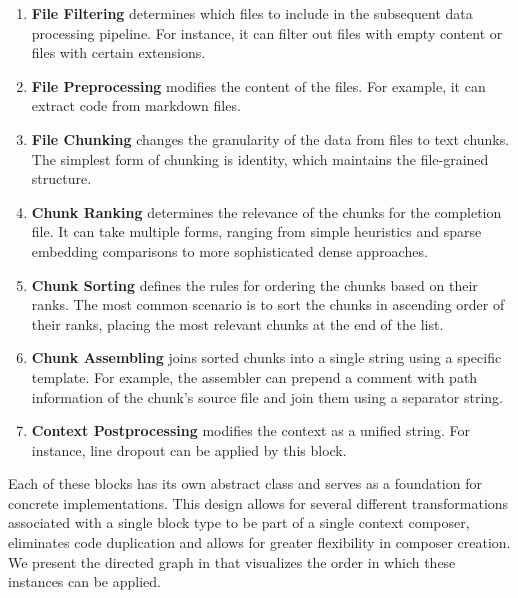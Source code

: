 \begin{enumerate}
    \item \textbf{File Filtering} determines which files to include in the subsequent data processing pipeline. For instance, it can filter out files with empty content or files with certain extensions.
    \item \textbf{File Preprocessing} modifies the content of the files. For example, it can extract code from markdown files.
    \item \textbf{File Chunking} changes the granularity of the data from files to text chunks. The simplest form of chunking is identity, which maintains the file-grained structure.
    \item \textbf{Chunk Ranking} determines the relevance of the chunks for the completion file. It can take multiple forms, ranging from simple heuristics and sparse embedding comparisons to more sophisticated dense approaches.
    \item \textbf{Chunk Sorting} defines the rules for ordering the chunks based on their ranks. The most common scenario is to sort the chunks in ascending order of their ranks, placing the most relevant chunks at the end of the list.
    \item \textbf{Chunk Assembling} joins sorted chunks into a single string using a specific template. For example, the assembler can prepend a comment with path information of the chunk's source file and join them using a separator string.
    \item \textbf{Context Postprocessing} modifies the context as a unified string. For instance, line dropout can be applied by this block.
\end{enumerate}

Each of these blocks has its own abstract class and serves as a foundation for concrete implementations. This design allows for several different transformations associated with a single block type to be part of a single context composer, eliminates code duplication and allows for greater flexibility in composer creation. We present the directed graph in  that visualizes the order in which these instances can be applied.

